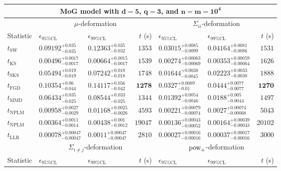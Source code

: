 \begin{tabular}{l|llr|llr}
	\toprule
	\multicolumn{7}{c}{{\bf MoG model with $\mathbf{d=5}$, $\mathbf{q=3}$, and $\mathbf{n=m=10^{4}}$}} \\
	\toprule
	\multicolumn{1}{c}{} & \multicolumn{3}{c}{$\mu$-deformation} & \multicolumn{3}{c}{$\Sigma_{ii}$-deformation} \\
	Statistic & $\epsilon_{95\%\mathrm{CL}}$ & $\epsilon_{99\%\mathrm{CL}}$ & $t$ (s) & $\epsilon_{95\%\mathrm{CL}}$ & $\epsilon_{99\%\mathrm{CL}}$ & $t$ (s) \\
	\midrule
	$t_{\mathrm{SW}}$ & $0.09192_{-0.035}^{+0.035}$ & $0.12363_{-0.032}^{+0.035}$ & $1353$ & $0.03015_{-0.0099}^{+0.0085}$ & $0.04164_{-0.0086}^{+0.0081}$ & $1531$ \\
	$t_{\overline{\mathrm{KS}}}$ & ${\mathbf{0.00496_{-0.0017}^{+0.0017}}}$ & ${\mathbf{0.00664_{-0.0017}^{+0.0015}}}$ & $1539$ & ${\mathbf{0.00274_{-0.00069}^{+0.00063}}}$ & ${\mathbf{0.00353_{-0.00064}^{+0.00059}}}$ & $1626$ \\
	$t_{\mathrm{SKS}}$ & $0.05494_{-0.019}^{+0.019}$ & $0.07242_{-0.018}^{+0.018}$ & $1748$ & $0.01644_{-0.0045}^{+0.0038}$ & $0.02223_{-0.0038}^{+0.0033}$ & $1888$ \\
	$t_{\mathrm{FGD}}$ & $0.10354_{-0.044}^{+0.06}$ & $0.14117_{-0.042}^{+0.056}$ & ${\mathbf{1278}}$ & $0.0327_{-0.01}^{+0.0089}$ & $0.0444_{-0.0077}^{+0.0077}$ & ${\mathbf{1270}}$ \\
	$t_{\mathrm{MMD}}$ & $0.06434_{-0.025}^{+0.035}$ & $0.08544_{-0.025}^{+0.033}$ & $1344$ & $0.01392_{-0.0046}^{+0.0054}$ & $0.0188_{-0.0044}^{+0.005}$ & $1497$ \\
\rowcolor{red!35}	$t_{\mathrm{NPLM}}$ & $0.00958_{-0.0029}^{+0.0027}$ & $0.01168_{-0.0026}^{+0.0025}$ & $4593$ & $0.00221_{-0.00074}^{+0.00079}$ & $0.0027_{-0.00068}^{+0.00074}$ & $5043$ \\
\rowcolor{blue!35}	$t_{\mathrm{NPLM}}$ & $0.00364_{-0.0014}^{+0.0011}$ & $0.00438_{-0.0012}^{+0.001}$ & $19047$ & $0.00136_{-0.00052}^{+0.00043}$ & $0.00164_{-0.00043}^{+0.00039}$ & $20102$ \\
	$t_{\mathrm{LLR}}$ & $0.00078_{-0.00047}^{+0.00047}$ & $0.0011_{-0.00047}^{+0.00047}$ & $2810$ & $0.00027_{-0.00016}^{+0.00016}$ & $0.00037_{-0.00016}^{+0.00017}$ & $3000$ \\
	\toprule
	\multicolumn{1}{c}{} & \multicolumn{3}{c}{$\Sigma_{i\neq j}$-deformation} & \multicolumn{3}{c}{$\rm{pow}_{+}$-deformation} \\
	Statistic & $\epsilon_{95\%\mathrm{CL}}$ & $\epsilon_{99\%\mathrm{CL}}$ & $t$ (s) & $\epsilon_{95\%\mathrm{CL}}$ & $\epsilon_{99\%\mathrm{CL}}$ & $t$ (s) \\

\end{tabular}
